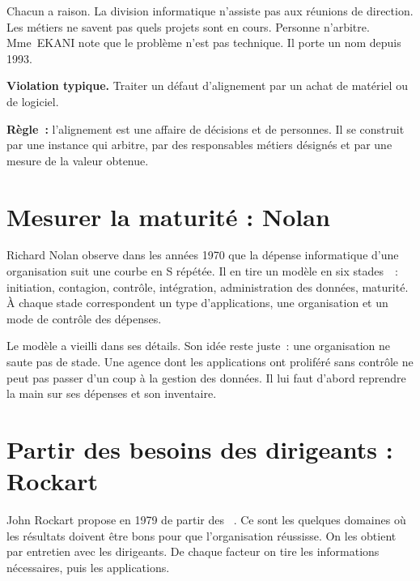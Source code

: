 Chacun a raison. La division informatique n'assiste pas aux réunions de direction. Les métiers ne savent pas quels
projets sont en cours. Personne n'arbitre. Mme~EKANI note que le problème n'est pas technique. Il porte un nom
depuis 1993.

\begin{boxalert}
\textbf{Violation typique.} Traiter un défaut d'alignement par un achat de matériel ou de logiciel.

\smallskip
\textbf{Règle~:} l'alignement est une affaire de décisions et de personnes. Il se construit par une instance
qui arbitre, par des responsables métiers désignés et par une mesure de la valeur obtenue.
\end{boxalert}

\section{Mesurer la maturité : Nolan}
\label{sec:c03-nolan}

Richard Nolan observe dans les années 1970 que la dépense informatique d'une organisation suit une courbe en S
répétée. Il en tire un modèle en six stades~\cite{nolan1979}~: initiation, contagion, contrôle, intégration,
administration des données, maturité. À chaque stade correspondent un type d'applications, une organisation et
un mode de contrôle des dépenses.

Le modèle a vieilli dans ses détails. Son idée reste juste~: une organisation ne saute pas de stade. Une agence
dont les applications ont proliféré sans contrôle ne peut pas passer d'un coup à la gestion des données. Il lui
faut d'abord reprendre la main sur ses dépenses et son inventaire.

\section{Partir des besoins des dirigeants : Rockart}
\label{sec:c03-rockart}

John Rockart propose en 1979 de partir des ~\cite{rockart1979}. Ce sont les
quelques domaines où les résultats doivent être bons pour que l'organisation réussisse. On les obtient par
entretien avec les dirigeants. De chaque facteur on tire les informations nécessaires, puis les applications.


